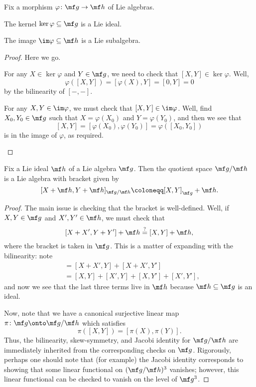 \documentclass[../notes.tex]{subfiles}
\begin{document}
\begin{lemma}
	Fix a morphism $\varphi\colon\mf g\to\mf h$ of Lie algebras.
	\begin{listalph}
		\item The kernel $\ker\varphi\subseteq\mf g$ is a Lie ideal.
		\item The image  $\im\varphi\subseteq\mf h$ is a Lie subalgebra.
	\end{listalph}
\end{lemma}
\begin{proof}
	Here we go.
	\begin{listalph}
		\item For any $X\in\ker\varphi$ and $Y\in\mf g$, we need to check that $[X,Y]\in\ker\varphi$. Well,
		\[\varphi([X,Y])=[\varphi(X),Y]=[0,Y]=0\]
		by the bilinearity of $[-,-]$.
		\item For any $X,Y\in\im\varphi$, we must check that $[X,Y]\in\im\varphi$. Well, find $X_0,Y_0\in\mf g$ such that $X=\varphi(X_0)$ and $Y=\varphi(Y_0)$, and then we see that
		\[[X,Y]=[\varphi(X_0),\varphi(Y_0)]=\varphi([X_0,Y_0])\]
		is in the image of $\varphi$, as required.
		\qedhere
	\end{listalph}
\end{proof}
\begin{lemma}
	Fix a Lie ideal $\mf h$ of a Lie algebra $\mf g$. Then the quotient space $\mf g/\mf h$ is a Lie algebra with bracket given by
	\[[X+\mf h,Y+\mf h]_{\mf g/\mf h}\coloneqq[X,Y]_{\mf g}+\mf h.\]
\end{lemma}
\begin{proof}
	The main issue is checking that the bracket is well-defined. Well, if $X,Y\in\mf g$ and $X',Y'\in\mf h$, we must check that
	\[[X+X',Y+Y']+\mf h\stackrel?=[X,Y]+\mf h,\]
	where the bracket is taken in $\mf g$. This is a matter of expanding with the bilinearity: note
	\begin{align*}
		[X+X',Y+Y'] &= [X+X',Y]+[X+X',Y'] \\
		&= [X,Y]+[X',Y]+[X,Y']+[X',Y'],
	\end{align*}
	and now we see that the last three terms live in $\mf h$ because $\mf h\subseteq\mf g$ is an ideal.

	Now, note that we have a canonical surjective linear map $\pi\colon\mf g\onto\mf g/\mf h$ which satisfies
	\[\pi([X,Y])=[\pi(X),\pi(Y)].\]
	Thus, the bilinearity, skew-symmetry, and Jacobi identity for $\mf g/\mf h$ are immediately inherited from the corresponding checks on $\mf g$. Rigorously, perhaps one should note that (for example) the Jacobi identity corresponds to showing that some linear functional on $(\mf g/\mf h)^3$ vanishes; however, this linear functional can be checked to vanish on the level of $\mf g^3$.
\end{proof}
\end{document}
